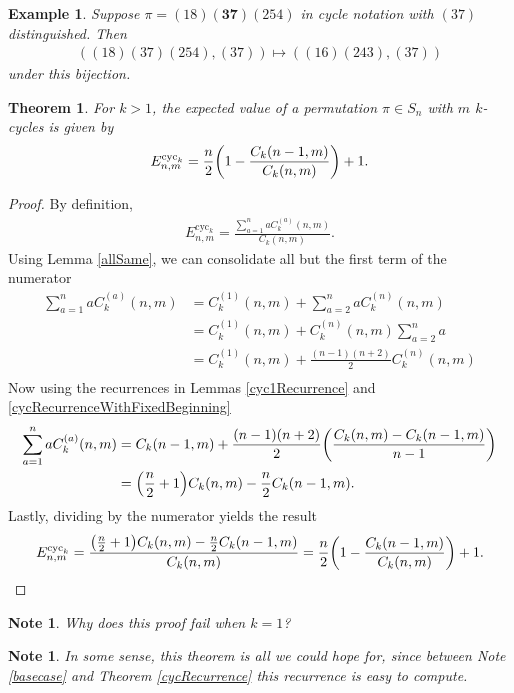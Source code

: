 \documentclass{article}
\let\originalleft\left
\let\originalright\right
\renewcommand{\left}{\mathopen{}\mathclose\bgroup\originalleft}
\renewcommand{\right}{\aftergroup\egroup\originalright}
\newtheorem{theorem}[theo]{Theorem}
\newtheorem{example}[theo]{Example}
\newtheorem{note}[theo]{Note}
\begin{document}
  \begin{example}
    Suppose $\pi = (18)\mathbf{(37)}(254)$ in cycle notation with $(37)$ distinguished.
    Then \begin{align}
      ((18)(37)(254), (37)) \mapsto ((16)(243), (37))
    \end{align} under this bijection.
  \end{example}
  \begin{theorem}
    \label{expectedValueCyc2}
    For $k > 1$, the expected value of a permutation $\pi \in S_n$ with $m$ $k$-cycles is
    given by \begin{align}
      E_{n,m}^{\text{cyc}_k} = \frac n2\left(1 - \frac{C_k(n-1,m)}{C_k(n,m)}\right) + 1.
    \end{align}
  \end{theorem}
  \begin{proof}
    By definition, \begin{align}
      E_{n,m}^{\text{cyc}_k} = \frac{
        \displaystyle \sum_{a = 1}^n aC_k^{(a)}(n, m)
      }{
        C_k(n, m)
      }.
    \end{align} Using Lemma \ref{allSame}, we can consolidate all but the first term of
    the numerator \begin{align}
      \sum_{a = 1}^n aC_k^{(a)}(n, m) &=
      C_k^{(1)}(n,m) +
      \sum_{a = 2}^n aC_k^{(n)}(n, m) \\
      &= C_k^{(1)}(n,m) + C_k^{(n)}(n, m)\sum_{a = 2}^n a \\
      &= C_k^{(1)}(n,m) + \frac{(n-1)(n+2)}{2} C_k^{(n)}(n, m) \\
    \end{align}
    Now using the recurrences in Lemmas \ref{cyc1Recurrence} and
    \ref{cycRecurrenceWithFixedBeginning} \begin{align}
      \sum_{a = 1}^n aC_k^{(a)}(n, m) &=
      C_k(n-1,m) + \frac{(n-1)(n+2)}{2}\left(
        \frac{C_k(n, m) - C_k(n-1, m)}{n - 1}
      \right) \\
      &= \left(\frac{n}{2} + 1\right) C_k(n,m) - \frac n2C_k(n-1,m).
    \end{align}
    Lastly, dividing by the numerator yields the result \begin{align}
      E_{n,m}^{\text{cyc}_k}
      = \frac{
        \left(\frac{n}{2} + 1\right) C_k(n,m) - \frac n2C_k(n-1,m)
      }{
        C_k(n, m)
      }
      = \frac n2\left(1 - \frac{C_k(n-1,m)}{C_k(n,m)}\right) + 1.
    \end{align}
  \end{proof}
  \begin{note}
    Why does this proof fail when $k = 1$?
  \end{note}
  \begin{note}
    In some sense, this theorem is all we could hope for, since between 
    Note \ref{basecase} and Theorem \ref{cycRecurrence} 
    this recurrence is easy to compute.
  \end{note}
\end{document}
